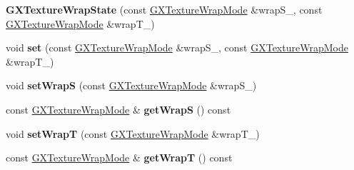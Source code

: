 \begin{DoxyCompactItemize}
\item 
{\bfseries G\+X\+Texture\+Wrap\+State} (const \hyperlink{class_magnum_1_1_g_x_texture_wrap_mode}{G\+X\+Texture\+Wrap\+Mode} \&wrap\+S\+\_\+, const \hyperlink{class_magnum_1_1_g_x_texture_wrap_mode}{G\+X\+Texture\+Wrap\+Mode} \&wrap\+T\+\_\+)\hypertarget{class_magnum_1_1_g_x_texture_wrap_state_abb0ed786f18bca0a1cb0cbd374fc47d3}{}\label{class_magnum_1_1_g_x_texture_wrap_state_abb0ed786f18bca0a1cb0cbd374fc47d3}

\item 
void {\bfseries set} (const \hyperlink{class_magnum_1_1_g_x_texture_wrap_mode}{G\+X\+Texture\+Wrap\+Mode} \&wrap\+S\+\_\+, const \hyperlink{class_magnum_1_1_g_x_texture_wrap_mode}{G\+X\+Texture\+Wrap\+Mode} \&wrap\+T\+\_\+)\hypertarget{class_magnum_1_1_g_x_texture_wrap_state_a213834d719d752d77557f45612076219}{}\label{class_magnum_1_1_g_x_texture_wrap_state_a213834d719d752d77557f45612076219}

\item 
void {\bfseries set\+WrapS} (const \hyperlink{class_magnum_1_1_g_x_texture_wrap_mode}{G\+X\+Texture\+Wrap\+Mode} \&wrap\+S\+\_\+)\hypertarget{class_magnum_1_1_g_x_texture_wrap_state_a9abd7cd00ddffbab0c5f3ad67062a862}{}\label{class_magnum_1_1_g_x_texture_wrap_state_a9abd7cd00ddffbab0c5f3ad67062a862}

\item 
const \hyperlink{class_magnum_1_1_g_x_texture_wrap_mode}{G\+X\+Texture\+Wrap\+Mode} \& {\bfseries get\+WrapS} () const \hypertarget{class_magnum_1_1_g_x_texture_wrap_state_a103da16fecd3860c45c3f608c41b0d54}{}\label{class_magnum_1_1_g_x_texture_wrap_state_a103da16fecd3860c45c3f608c41b0d54}

\item 
void {\bfseries set\+WrapT} (const \hyperlink{class_magnum_1_1_g_x_texture_wrap_mode}{G\+X\+Texture\+Wrap\+Mode} \&wrap\+T\+\_\+)\hypertarget{class_magnum_1_1_g_x_texture_wrap_state_a7ef09d1c2bb7240ac178337a0e2144f8}{}\label{class_magnum_1_1_g_x_texture_wrap_state_a7ef09d1c2bb7240ac178337a0e2144f8}

\item 
const \hyperlink{class_magnum_1_1_g_x_texture_wrap_mode}{G\+X\+Texture\+Wrap\+Mode} \& {\bfseries get\+WrapT} () const \hypertarget{class_magnum_1_1_g_x_texture_wrap_state_a8b75506cb8a1358a09a1f5c7a8b81691}{}\label{class_magnum_1_1_g_x_texture_wrap_state_a8b75506cb8a1358a09a1f5c7a8b81691}

\end{DoxyCompactItemize}


